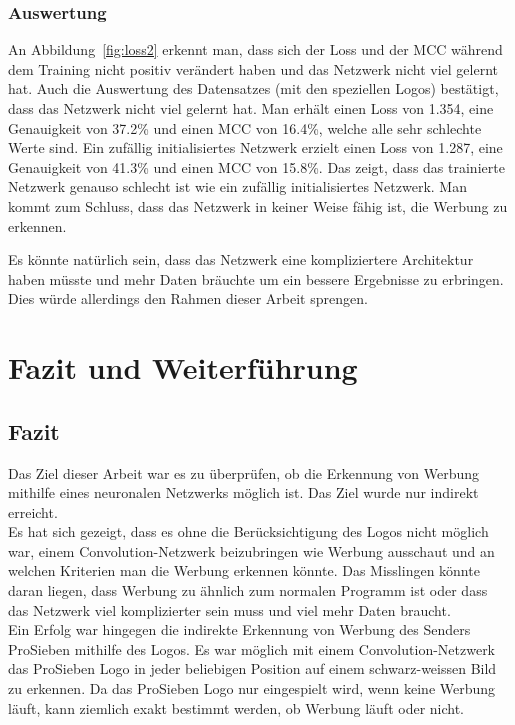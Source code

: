 \documentclass[12pt,a4paper]{report}
\begin{document}
\subsection{Auswertung}
An Abbildung~\ref{fig:loss2} erkennt man,
dass sich der Loss und der MCC während dem Training nicht positiv verändert haben und das Netzwerk nicht viel gelernt hat.
Auch die Auswertung des Datensatzes (mit den speziellen Logos) bestätigt, dass das Netzwerk nicht viel gelernt hat.
Man erhält einen Loss von 1.354, eine Genauigkeit von 37.2\% und einen MCC von 16.4\%, welche alle sehr schlechte Werte sind.
Ein zufällig initialisiertes Netzwerk erzielt einen Loss von 1.287, eine Genauigkeit von 41.3\% und einen MCC von 15.8\%.
Das zeigt, dass das trainierte Netzwerk genauso schlecht ist wie ein zufällig initialisiertes Netzwerk.
Man kommt zum Schluss, dass das Netzwerk in keiner Weise fähig ist, die Werbung zu erkennen.

Es könnte natürlich sein, dass das Netzwerk eine kompliziertere Architektur haben müsste und mehr Daten bräuchte um ein bessere Ergebnisse zu erbringen.
Dies würde allerdings den Rahmen dieser Arbeit sprengen.

\chapter{Fazit und Weiterführung}\label{ch:fazitUndWeiterführung}
\section{Fazit}
Das Ziel dieser Arbeit war es zu überprüfen, ob die Erkennung von Werbung mithilfe eines neuronalen Netzwerks möglich ist.
Das Ziel wurde nur indirekt erreicht.\bigskip\\
Es hat sich gezeigt, dass es ohne die Berücksichtigung des Logos nicht möglich war, einem Convolution-Netzwerk beizubringen wie Werbung ausschaut und an welchen Kriterien man die Werbung erkennen könnte.
Das Misslingen könnte daran liegen, dass Werbung zu ähnlich zum normalen Programm ist oder dass das Netzwerk viel komplizierter sein muss und viel mehr Daten braucht.\bigskip\\
Ein Erfolg war hingegen die indirekte Erkennung von Werbung des Senders ProSieben mithilfe des Logos.
Es war möglich mit einem Convolution-Netzwerk das ProSieben Logo in jeder beliebigen Position auf einem schwarz-weissen Bild zu erkennen.
Da das ProSieben Logo nur eingespielt wird, wenn keine Werbung läuft,
kann ziemlich exakt bestimmt werden, ob Werbung läuft oder nicht.
\end{document}
